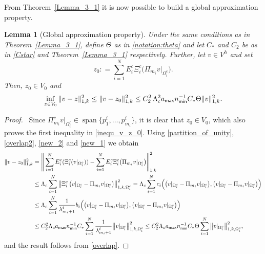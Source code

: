 \documentclass[numbers,webpdf,imaiai]{ima-authoring-template}%
\theoremstyle{thmstyletwo}%
\newtheorem{lemma}[theorem]{Lemma}
\numberwithin{equation}{section}
\newcommand{\Cstar}{C_{\ast}}
\newcommand{\assign}{\mathrel{\mathop:}=}
\numberwithin{equation}{section}
\DeclareMathOperator{\linspan}{span}
\newcommand{\amax}{a_{\textup{\textsf{max}}}}
\newcommand{\nmin}{n_{\textup{\textsf{min}}}}
\begin{document}
{From Theorem~\ref{Lemma_3_1} it is now possible to build a global approximation property. 


\begin{lemma}[Global approximation property]
\label{Lemma_3_2}
Under the same conditions as in Theorem~\ref{Lemma_3_1}, define $\Theta$ as in \eqref{notation:theta}
and let $\Cstar$ and $C_2$ be as in \eqref{Cstar} and Theorem~\ref{Lemma_3_1} respectively.
Further, let $v \in V^h$ and {set}
\begin{equation}\label{def_z_0_z_i}
	z_0 \assign \sum_{i=1}^N E_i^c \Xi^c_i \bigl(\Pi_{m_i} v|_{\Omega_i^c}\bigr).
\end{equation}
Then, $z_0 \in  V_0$ and
\begin{equation}\label{inequ_v_z_0}
	\inf_{z\in V_0}\|v-z\|_{1,k}^2 \le \|v-z_0\|_{1,k}^2 \le C_2^2\,\Lambda_c^2 \amax \nmin^{-1} \Cstar
	\Theta\|v\|^2_{1,k}. 
\end{equation}
\end{lemma}

\begin{proof}\,
Since $\Pi_{m_i}^c v|_{\Omega_i^c}\in\linspan\{p_1^i,\ldots,p_{m_i}^i\}$, it is clear that $z_0 \in V_0$,
which also proves the first inequality in \eqref{inequ_v_z_0}.
Using \eqref{partition_of_unity}, \eqref{overlap2}, \eqref{new_2} and  \eqref{new_1} we obtain
\begin{align}
	\|v-z_0\|_{1,k}^2  
	&= \Bigg\| \sum_{i=1}^N  E_i^c (\Xi_i^c (v|_{\Omega_i^c}))-\sum_{i=1}^N  E^c_i \Xi^c_i \bigl(\Pi_{m_i} {v|_{\Omega_i^c}}\bigr) \Bigg\|_{1,k}^2
	\\ 
	&\le \Lambda_c \sum_{i=1}^N \left \|\Xi_i^c \left(v|_{\Omega_i^c}- \Pi_{m_i} {v|_{\Omega_i^c}} \right) \right\|_{1,k,{\Omega_i^c}}^2 \nonumber  = \Lambda_c \sum_{i=1}^N  c_{i}\Bigl(  \bigl({v|_{\Omega_i^c}}-\Pi_{m_i}{v|_{\Omega_i^c}}\bigr), \bigl({v|_{\Omega_i^c}}-\Pi_{m_i}{v|_{\Omega_i^c}}\bigr)\Bigr)
	\nonumber \\
	&\le \Lambda_c \sum_{i=1}^N \frac{1}{\lambda_{m_i+1}^i} b_{i}\Bigl(\bigl({v|_{\Omega_i^c}}-\Pi_{m_i}{v|_{\Omega_i^c}}\bigr),\bigl({v|_{\Omega_i^c}}-\Pi_{m_i}{v|_{\Omega_i^c}}\bigr)\Bigr) 
	\nonumber \\
	&\le C_2^2 \Lambda_c \amax \nmin^{-1}\Cstar \sum_{i=1}^N\frac{1}{\lambda_{m_i+1}^i}\big\|v|_{\Omega_i^c}\big\|_{1,k,\Omega_i^c}^2  
	\le C_2^2 \Lambda_c \amax \nmin^{-1}\Cstar \Theta\sum_{i=1}^N\big\|v|_{\Omega_i^c}\big\|_{1,k,\Omega_i^c}^2, 
	\label{proof_inequ_sum_z_i}
\end{align}
and the result follows from \eqref{overlap}.
\end{proof}

}
\end{document}
